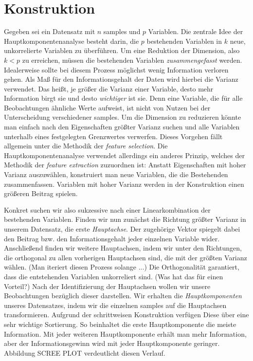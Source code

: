 \section{Konstruktion}

Gegeben sei ein Datensatz mit $n$ samples und $p$ Variablen. Die zentrale Idee der Hauptkomponentenanalyse besteht darin, die $p$ bestehenden Variablen in $k$ neue, unkorrelierte Variablen zu überführen. Um eine Reduktion der Dimension, also $k < p$ zu erreichen, müssen die bestehenden Variablen \textit{zusammengefasst} werden. Idealerweise sollte bei diesem Prozess möglichst wenig Information verloren gehen. Als Maß für den Informationsgehalt der Daten wird hierbei die Varianz verwendet. Das heißt, je größer die Varianz einer Variable, desto mehr Information birgt sie und desto \textit{wichtiger} ist sie. Denn eine Variable, die für alle Beobachtungen ähnliche Werte aufweist, ist nicht von Nutzen bei der Unterscheidung verschiedener samples. Um die Dimension zu reduzieren könnte man einfach nach den Eigenschaften größter Varianz suchen und alle Variablen unterhalb eines festgelegten Grenzwertes verwerfen. Dieses Vorgehen fällt allgemein unter die Methodik der \textit{feature selection}. Die Hauptkomponentenanalyse verwendet allerdings ein anderes Prinzip, welches der Methodik der \textit{feature extraction} zuzuordnen ist: Anstatt Eigenschaften mit hoher Varianz auszuwählen, konstruiert man neue Variablen, die die Bestehenden zusammenfassen. Variablen mit hoher Varianz werden in der Konstruktion einen größeren Beitrag spielen.

Konkret suchen wir also sukzessive nach einer Linearkombination der bestehenden Variablen. Finden wir nun zunächst die Richtung größter Varianz in unserem Datensatz, die erste \textit{Hauptachse}. Der zugehörige Vektor spiegelt dabei den Beitrag bzw. den Informationsgehalt jeder einzelnen Variable wider. Anschließend finden wir weitere Hauptachsen, indem wir unter den Richtungen, die orthogonal zu allen vorherigen Hauptachsen sind, die mit der größten Varianz wählen. (Man iteriert diesen Prozess solange ...) Die Orthogonalität garantiert, dass die entstehenden Variablen unkorreliert sind. (Was hat das für einen Vorteil?) Nach der Identifizierung der Hauptachsen wollen wir unsere Beobachtungen bezüglich dieser darstellen. Wir erhalten die \textit{Hauptkomponenten} unseres Datensatzes, indem wir die einzelnen samples auf die Hauptachsen transformieren. Aufgrund der schrittweisen Konstruktion verfügen Diese über eine sehr wichtige Sortierung. So beinhaltet die erste Hauptkomponente die meiste Information. Mit jeder weiteren Hauptkomponente erhält man mehr Information, aber der Informationsgewinn wird mit jeder Hauptkomponente geringer. Abbildung SCREE PLOT verdeutlicht diesen Verlauf.

